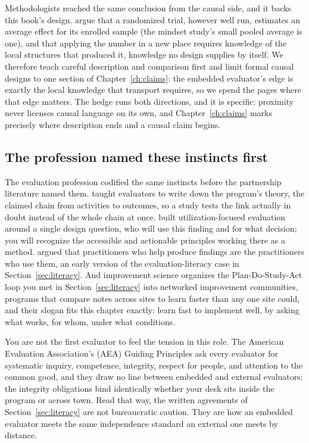 \documentclass[
    a4paper,
    fontsize=10pt,
    twoside=true,
    numbers=noenddot,
]{kaobook}
\begin{document}
Methodologists reached the same conclusion from the causal side, and it backs this book's design. \textcite{deaton2018rcts} argue that a randomized trial, however well run, estimates an average effect for its enrolled sample (the mindset study's small pooled average is one), and that applying the number in a new place requires knowledge of the local structures that produced it, knowledge no design supplies by itself. We therefore teach careful description and comparison first and limit formal causal designs to one section of Chapter~\ref{ch:claims}: the embedded evaluator's edge is exactly the local knowledge that transport requires, so we spend the pages where that edge matters. The hedge runs both directions, and it is specific: proximity never licenses causal language on its own, and Chapter~\ref{ch:claims} marks precisely where description ends and a causal claim begins.

\subsection{The profession named these instincts first}\label{sec:ch01-profession-instincts}
The evaluation profession codified the same instincts before the partnership literature named them. \textcite{weiss1998evaluation} taught evaluators to write down the program's theory, the claimed chain from activities to outcomes, so a study tests the link actually in doubt instead of the whole chain at once. \textcite{patton2008utilization} built utilization-focused evaluation around a single design question, who will use this finding and for what decision; you will recognize the accessible and actionable principles working there as a method. \textcite{cousins1992participatory} argued that practitioners who help produce findings are the practitioners who use them, an early version of the evaluation-literacy case in Section~\ref{sec:literacy}. And improvement science \parencite{bryk2015improve} organizes the Plan-Do-Study-Act loop you met in Section~\ref{sec:literacy} into networked improvement communities, programs that compare notes across sites to learn faster than any one site could, and their slogan fits this chapter exactly: learn fast to implement well, by asking what works, for whom, under what conditions.

You are not the first evaluator to feel the tension in this role. The American Evaluation Association's (AEA) Guiding Principles \parencite{aea2018principles} ask every evaluator for systematic inquiry, competence, integrity, respect for people, and attention to the common good, and they draw no line between embedded and external evaluators: the integrity obligations bind identically whether your desk sits inside the program or across town. Read that way, the written agreements of Section~\ref{sec:literacy} are not bureaucratic caution. They are how an embedded evaluator meets the same independence standard an external one meets by distance.
\end{document}
